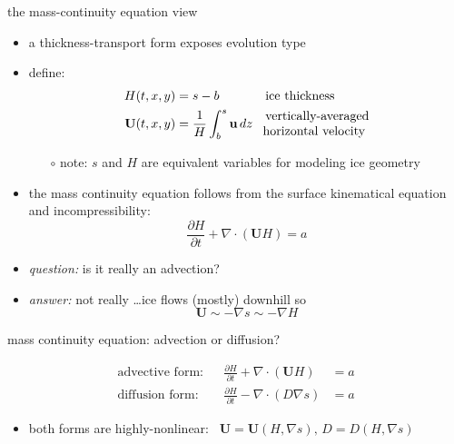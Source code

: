 \documentclass[svgnames,
               hyperref={colorlinks,citecolor=DeepPink4,linkcolor=FireBrick,urlcolor=Maroon},
               usepdftitle=false]  %
               {beamer}
\newcommand{\grad}{\nabla}
\newcommand{\bu}{\mathbf{u}}
\newcommand{\bU}{\mathbf{U}}
\begin{document}
\begin{frame}{the mass-continuity equation view}

\begin{itemize}
\item a thickness-transport form exposes evolution type
\item define:
\begin{align*}
H(t,x,y) &=s-b && \text{ice thickness} \\
\bU(t,x,y) &= \frac{1}{H} \int_b^s \bu \,dz && \begin{matrix} \text{vertically-averaged} \\ \hspace{-1.8mm} \text{horizontal velocity} \end{matrix}
\end{align*}

    \begin{itemize}
    \item[$\circ$] note: $s$ and $H$ are equivalent variables for modeling ice geometry
    \end{itemize}
\item the \alert{mass continuity equation} follows from the surface kinematical equation and incompressibility:
   $$\frac{\partial H}{\partial t} + \nabla \cdot \left(\bU H\right) = a$$

\smallskip
\item<2-> \emph{question:} is it really an advection?
\item<2->[] \emph{answer:} not really \dots ice flows (mostly) downhill so
  $$\bU \sim - \grad s \sim - \grad H$$
\end{itemize}
\end{frame}


\begin{frame}{mass continuity equation: advection or diffusion?}

\begin{align*}
\text{advective form:} && \frac{\partial H}{\partial t} + \nabla \cdot \left(\bU H\right) &= a \\
\text{diffusion form:} && \frac{\partial H}{\partial t} - \nabla \cdot \left(D \grad s\right) &= a
\end{align*}
\begin{itemize}
\item both forms are highly-nonlinear: \, $\bU=\bU(H,\grad s), \, D = D(H,\grad s)$
\end{itemize}
\end{frame}
\end{document}
